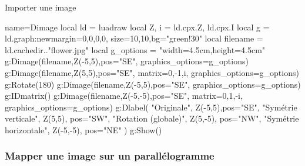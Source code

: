 \begin{demo}{Importer une image}
\begin{luadraw}{name=Dimage}
local ld = luadraw
local Z, i = ld.cpx.Z, ld.cpx.I
local g = ld.graph:new{margin={0,0,0,0}, size={10,10},bg="green!30"}
local filename = ld.cachedir.."flower.jpg"
local g_options = "width=4.5cm,height=4.5cm"
g:Dimage(filename,Z(-5,5),{pos="SE", graphics_options=g_options})
g:Dimage(filename,Z(5,5),{pos="SE", matrix={0,-1,i}, graphics_options=g_options})
g:Rotate(180)
g:Dimage(filename,Z(-5,5),{pos="SE", graphics_options=g_options})
g:IDmatrix()
g:Dimage(filename,Z(-5,-5),{pos="SE", matrix={0,1,-i}, graphics_options=g_options})
g:Dlabel( "Originale", Z(-5,5),{pos="SE"},
"Symétrie verticale", Z(5,5), {pos="SW"},
"Rotation (globale)", Z(5,-5), {pos="NW"},
"Symétrie horizontale", Z(-5,-5), {pos="NE"} )
g:Show()
\end{luadraw}
\end{demo}

\subsubsection{Mapper une image sur un parallélogramme}

